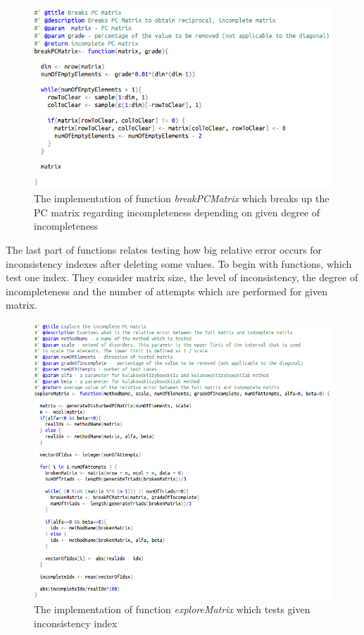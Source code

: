 \begin{figure}[h]
\centerline{\includegraphics[scale=0.73]{images/kod13.png}}
\caption{The implementation of function \textit{breakPCMatrix} which breaks up the PC matrix regarding incompleteness depending on given degree of incompleteness}
\label{fig:rstudio}
\end{figure}

The last part of functions relates testing how big relative error occurs for inconsistency indexes after deleting some values. To begin with functions, which test one index. They consider matrix size, the level of inconsistency, the degree of incompleteness and the number of attempts which are performed for given matrix.

\begin{figure}[h]
\centerline{\includegraphics[scale=0.58]{images/kod21.png}}
\caption{The implementation of function \textit{exploreMatrix} which tests given inconsistency index}
\label{fig:rstudio}
\end{figure}

